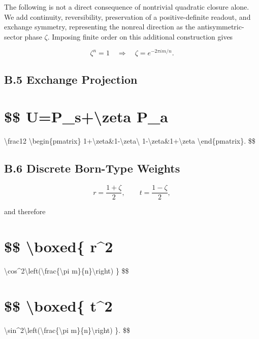 \documentclass[
  a4paper,
  10pt]{article}
\begin{document}
The following is not a direct consequence of nontrivial quadratic
closure alone. We add continuity, reversibility, preservation of a
positive-definite readout, and exchange symmetry, representing the
nonreal direction as the antisymmetric-sector phase \(\zeta\). Imposing
finite order on this additional construction gives

\[
\zeta^n=1
\quad\Longrightarrow\quad
\zeta=e^{-2\pi im/n}.
\]

\subsection{B.5 Exchange Projection}\label{b5-exchange-projection}

\section{\$\$ U=P\_s+\textbackslash zeta P\_a}\label{-up_szeta-p_a}

\textbackslash frac12 \textbackslash begin\{pmatrix\}
1+\textbackslash zeta\&1-\textbackslash zeta\textbackslash{}
1-\textbackslash zeta\&1+\textbackslash zeta
\textbackslash end\{pmatrix\}. \$\$

\subsection{B.6 Discrete Born-Type
Weights}\label{b6-discrete-born-type-weights}

\[
r=\frac{1+\zeta}{2},
\qquad
t=\frac{1-\zeta}{2},
\]

and therefore

\section{\$\$ \textbackslash boxed\{
\textbar r\textbar\^{}2}\label{-boxed-r2-1}

\textbackslash cos\^{}2\textbackslash left(\textbackslash frac\{\textbackslash pi
m\}\{n\}\textbackslash right) \} \$\$

\section{\$\$ \textbackslash boxed\{
\textbar t\textbar\^{}2}\label{-boxed-t2-1}

\textbackslash sin\^{}2\textbackslash left(\textbackslash frac\{\textbackslash pi
m\}\{n\}\textbackslash right) \}. \$\$
\end{document}
